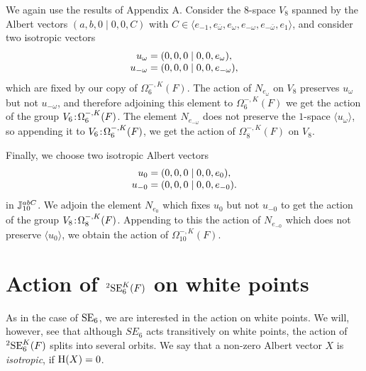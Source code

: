 We again use the results of Appendix A. Consider the $8$-space $V_8$ spanned by the Albert vectors $(a,b,0\mid 0,0,C)$ with 
$C \in \langle e_{-1}, e_{\bar{\omega}}, e_{\omega}, 
e_{- \omega}, e_{-\bar{\omega}}, e_1 \rangle$, and consider two isotropic vectors
\begin{equation}
	\begin{array}{r@{\;}c@{\;}l}
		u_{\omega} & = & (0,0,0 \mid 0,0,e_{\omega}), \\
		u_{-\omega} & = & (0,0,0 \mid 0,0,e_{-\omega}),
	\end{array}
\end{equation}
which are fixed by our copy of $\Omega_6^{-,K}(F)$. The action of $N_{e_{\omega}}$ on $V_8$
preserves $u_{\omega}$ but not $u_{-\omega}$, and therefore adjoining this element to 
$\Omega_6^{-,K}(F)$ we get the action of the group $V_6\mathord{{\;\!{:}\;\!}}\Omega_6^{-,K}(F)$. The element
$N_{e_{-\omega}}$ does not preserve the $1$-space $\langle u_{\omega} \rangle$, so appending it to 
$V_6\mathord{{\;\!{:}\;\!}}\Omega_6^{-,K}(F)$, we get the action of $\Omega_8^{-,K}(F)$ on $V_8$. 

Finally, we choose two isotropic Albert vectors
\begin{equation}
	\begin{array}{r@{\;}c@{\;}l}
		u_0 & = & (0,0,0\mid 0,0,e_0), \\
		u_{-0} & = & (0,0,0\mid 0,0,e_{-0}).
	\end{array}
\end{equation}
in $\mathbb{J}_{10}^{abC}$. We adjoin the element $N_{e_{0}}$ which fixes $u_0$ but not $u_{-0}$ to 
get the action of the group $V_8\mathord{{\;\!{:}\;\!}} \Omega_8^{-,K}(F)$. Appending to this the action of
$N_{e_{-0}}$ which does not preserve $\langle u_0 \rangle$, we obtain the action of
$\Omega_{10}^{-,K}(F)$.

\section{Action of ${}^2\mathrm{SE}_6^K(F)$ on white points}

As in the case of $\mathrm{SE}_6$, we are interested in the action on white points. We will, however, see 
that although $SE_6$ acts transitively on white points, the action of ${}^2\mathrm{SE}_6^K(F)$ splits
into several orbits. We say that a non-zero Albert vector $X$ is \textit{isotropic}, if
$\mathrm{H}(X) = 0$. 

